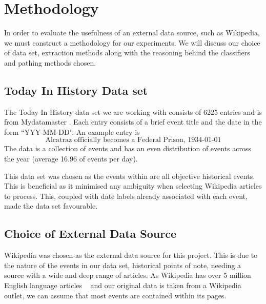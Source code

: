 \documentclass[bsc,frontabs,twoside,singlespacing,parskip,deptreport]{infthesis}     %
\begin{document}
\chapter{Methodology}\label{chapter:methodology}
In order to evaluate the usefulness of an external data source, such as Wikipedia, we must construct a methodology
for our experiments. We will discuss our choice of data set, extraction methods along with the reasoning behind the
classifiers and pathing methods chosen.


\section{Today In History Data set}
The Today In History data set we are working with consists of 6225 entries and is from Mydatamaster \cite{mydatamaster}.
Each entry consists of a  brief event title and the date in the form ``YYY-MM-DD''.
An example entry is
\begin{equation}
  \text{Alcatraz officially becomes a Federal Prison, 1934-01-01}\nonumber
\end{equation}
The data is a collection of events and has
an even distribution of events across the year (average 16.96 of events per day).

This data set was chosen as the events within are all objective historical events. This is beneficial as it minimised
any ambiguity when selecting Wikipedia articles to process. This, coupled with date labels already associated with
each event, made the data set favourable.


\section{Choice of External Data Source}
Wikipedia was chosen as the external data source for this project.
This is due to the nature of the events in our data set, historical points of note,
needing a source with a wide and deep range of articles.
As Wikipedia has over 5 million English language articles ~\cite{wikipedaisize} and our original data
is taken from a Wikipedia outlet, we can assume
that most events are contained within its pages.
\end{document}
